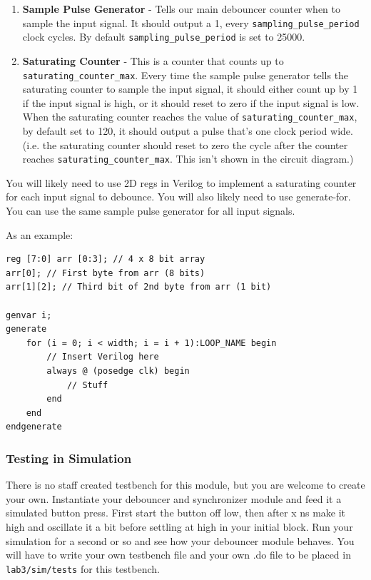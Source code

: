 \documentclass[11pt]{article}
\begin{document}
\begin{enumerate}
	\item \textbf{Sample Pulse Generator} - Tells our main debouncer counter when to sample the input signal. It should output a 1, every \verb|sampling_pulse_period| clock cycles. By default \verb|sampling_pulse_period| is set to 25000.
	
	\item \textbf{Saturating Counter} - This is a counter that counts up to \verb|saturating_counter_max|. Every time the sample pulse generator tells the saturating counter to sample the input signal, it should either count up by 1 if the input signal is high, or it should reset to zero if the input signal is low. When the saturating counter reaches the value of \verb|saturating_counter_max|, by default set to 120, it should output a pulse that's one clock period wide. (i.e. the saturating counter should reset to zero the cycle after the counter reaches \verb|saturating_counter_max|. This isn't shown in the circuit diagram.)
\end{enumerate}

You will likely need to use 2D regs in Verilog to implement a saturating counter for each input signal to debounce. You will also likely need to use generate-for. You can use the same sample pulse generator for all input signals.

As an example:

\begin{verbatim}
reg [7:0] arr [0:3]; // 4 x 8 bit array
arr[0]; // First byte from arr (8 bits)
arr[1][2]; // Third bit of 2nd byte from arr (1 bit)

genvar i;
generate
	for (i = 0; i < width; i = i + 1):LOOP_NAME begin
		// Insert Verilog here
		always @ (posedge clk) begin
			// Stuff
		end
	end
endgenerate
\end{verbatim}

\subsubsection{Testing in Simulation}
There is no staff created testbench for this module, but you are welcome to create your own. Instantiate your debouncer and synchronizer module and feed it a simulated button press. First start the button off low, then after x ns make it high and oscillate it a bit before settling at high in your initial block. Run your simulation for a second or so and see how your debouncer module behaves. You will have to write your own testbench file and your own .do file to be placed in \verb|lab3/sim/tests| for this testbench.
\end{document}
